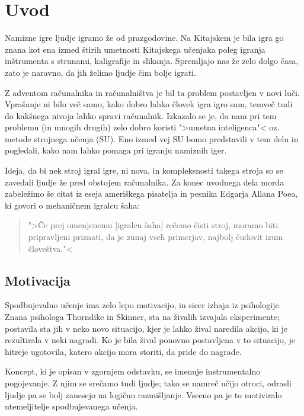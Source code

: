 \documentclass[12pt,a4paper]{amsart}
\theoremstyle{definition} %
\theoremstyle{plain} %
\begin{document}
\section{Uvod}
Namizne igre ljudje igramo že od prazgodovine. Na Kitajskem je bila igra go znana kot ena 
izmed štirih umetnosti Kitajskega učenjaka poleg igranja inštrumenta s strunami, kaligrafije
in slikanja. Spremljajo nas že zelo dolgo časa, zato je naravno, da jih želimo ljudje čim
bolje igrati.

Z adventom računalnika in računalništva je bil ta problem postavljen v novi luči. Vprašanje
ni bilo več samo, kako dobro lahko človek igra igro sam, temveč tudi do kakšnega nivoja 
lahko spravi računalnik. Izkazalo se je, da nam pri tem problemu (in mnogih drugih) zelo dobro
koristi ">umetna inteligenca"< oz. metode strojnega učenja (SU). Eno izmed vej SU bomo 
predstavili v tem delu in pogledali, kako nam lahko pomaga pri igranju namiznih iger.

Ideja, da bi nek stroj igral igre, ni nova, in kompleksnosti takega stroja so se zavedali ljudje
že pred obstojem računalnika. 
Za konec uvodnega dela morda zabeležimo še citat iz eseja ameriškega pisatelja in pesnika 
Edgarja Allana Poea, ki govori o mehaničnem igralcu šaha: 

\begin{quotation}
    ">Če prej omenjenemu [igralcu šaha] rečemo čisti stroj, moramo biti pripravljeni priznati, da je
    zunaj vseh primerjav, najbolj čudovit izum človeštva."<
\end{quotation}

\subsection{Motivacija}
Spodbujevalno učenje ima zelo lepo motivacijo, in sicer izhaja iz psihologije. Znana psihologa 
Thorndike in Skinner, sta na živalih izvajala eksperimente; postavila sta jih v neko novo 
situacijo, kjer je lahko žival naredila akcijo, ki je rezultirala v neki nagradi. Ko je bila
žival ponovno postavljena v to situacijo, je hitreje ugotovila, katero akcijo mora storiti, da
pride do nagrade.

Koncept, ki je opisan v zgornjem odstavku, se imenuje instrumentalno pogojevanje. Z njim se 
srečamo tudi ljudje; tako se namreč učijo otroci, odrasli ljudje pa se bolj zanesejo na 
logično razmišljanje. Vseeno pa je to motiviralo utemeljitelje spodbujevanega učenja.
\end{document}

